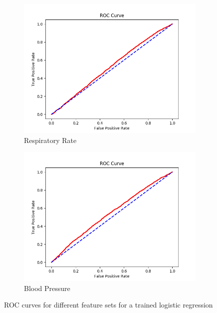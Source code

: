 \documentclass[]{article}
\begin{document}
\begin{figure}[t]
\begin{subfigure}[b]{0.475\textwidth}
		\centering 
		\includegraphics[width=\textwidth]{ROC_part3a_RESPIRATORY_RATE.png}
		\caption[]%
		{{\small Respiratory Rate}}    
		\label{fig:3aresp}
	\end{subfigure}
	\quad
	\begin{subfigure}[b]{0.475\textwidth}   
		\centering 
		\includegraphics[width=\textwidth]{ROC_part3a_BLOOD_PRESSURE.png}
		\caption[]%
		{{\small Blood Pressure}}    
		\label{fig:3abp}
	\end{subfigure}
	\caption[]
	{\small ROC curves for different feature sets for a trained logistic regression} 
	\label{fig:3a}
\end{figure}
\end{document}
